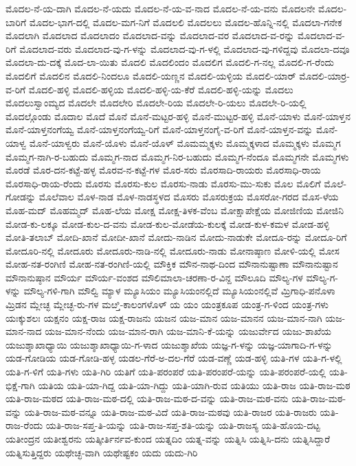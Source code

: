 ಮೊದಲ-ನೆ-ಯ-ದಾಗಿ
ಮೊದಲ-ನೆ-ಯದು
ಮೊದಲ-ನೆ-ಯ-ವ-ನಾದ
ಮೊದಲ-ನೆ-ಯ-ವನು
ಮೊದಲನೇ
ಮೊದಲ-ಬಾರಿಗೆ
ಮೊದಲ-ಭಾಗ-ದಲ್ಲಿ
ಮೊದಲ-ಮಗ-ನಿಗೆ
ಮೊದಲಲಿ
ಮೊದಲಲು
ಮೊದಲ-ಹೊನ್ನಿ-ನಲ್ಲಿ
ಮೊದಲಾ-ಗನೇಕ
ಮೊದಲಾಗಿ
ಮೊದಲಾದ
ಮೊದಲಾದಂ
ಮೊದಲಾದ-ವನ್ನು
ಮೊದಲಾದ-ವರ
ಮೊದಲಾದ-ವ-ರನ್ನು
ಮೊದಲಾದ-ವ-ರಿಗೆ
ಮೊದಲಾದ-ವರು
ಮೊದಲಾದ-ವು-ಗ-ಳನ್ನು
ಮೊದಲಾದ-ವು-ಗ-ಳಲ್ಲಿ
ಮೊದಲಾದ-ವು-ಗಳಿದ್ದವು
ಮೊದಲಾ-ದವೂ
ಮೊದಲಾ-ದು-ದಕ್ಕೆ
ಮೊದ-ಲಾ-ಯಿತು
ಮೊದಲಿ
ಮೊದಲಿಂದಂ
ಮೊದಲಿಗ
ಮೊದಲಿ-ಗ-ನಲ್ಲ
ಮೊದಲಿ-ಗ-ರೆಂದು
ಮೊದಲಿಗೆ
ಮೊದಲಿನ
ಮೊದಲಿ-ನಿಂದಲೂ
ಮೊದಲಿ-ಯಣ್ಣನ
ಮೊದಲಿ-ಯಳ್ಳಿಯ
ಮೊದಲಿ-ಯಾರ್
ಮೊದಲಿ-ಯಾರ್ರ-ವ-ರಿಗೆ
ಮೊದಲಿ-ಹಳ್ಳಿ
ಮೊದಲಿ-ಹಳ್ಳಿಯ
ಮೊದಲಿ-ಹಳ್ಳಿ-ಯ-ಕೆರೆ
ಮೊದಲಿ-ಹಳ್ಳಿ-ಯನ್ನು
ಮೊದಲು
ಮೊದಲುಸ್ವಾಂಮ್ಯದ
ಮೊದಲೇ
ಮೊದಲೇರಿ
ಮೊದಲೇ-ರಿಯ
ಮೊದಲೇ-ರಿ-ಯಲು
ಮೊದಲೇ-ರಿ-ಯಲ್ಲಿ
ಮೊದಲ್ಗೊಂಡು
ಮೊದಾಲ
ಮೊದೆ
ಮೊನೆ
ಮೊನೆ-ಮಟ್ಟರ-ಹಳ್ಳಿ
ಮೊನೆ-ಮುಟ್ಟರ-ಹಳ್ಳಿ
ಮೊನೆ-ಯಾಳು
ಮೊನೆ-ಯಾಳ್ತನ
ಮೊನೆ-ಯಾಳ್ತನಂಗೆಯ್ವ
ಮೊನೆ-ಯಾಳ್ತನಂಗೆಯ್ವ-ರಿಗೆ
ಮೊನೆ-ಯಾಳ್ತನಂಗೈ-ವ-ರಿಗೆ
ಮೊನೆ-ಯಾಳ್ತನ-ವನ್ನು
ಮೊನೆ-ಯಾಳ್ವ
ಮೊನೆ-ಯಾಳ್ವರು
ಮೊನೆ-ಯೊಳು
ಮೊನೆ-ಯೊಳ್
ಮೊಮಮ್ಮಕ್ಕಳು
ಮೊಮ್ಮಕ್ಕಳಾದ
ಮೊಮ್ಮಕ್ಕಳು
ಮೊಮ್ಮಗ
ಮೊಮ್ಮಗ-ನಾಗಿ-ರ-ಬಹುದು
ಮೊಮ್ಮಗ-ನಾದ
ಮೊಮ್ಮಗ-ನಿರ-ಬಹುದು
ಮೊಮ್ಮಗ-ನೆಂದೂ
ಮೊಮ್ಮಗನೇ
ಮೊಮ್ಮಗಳು
ಮೊರಡೆ
ಮೊರ-ದನ-ಕಟ್ಟೆ-ಹಳ್ಳ
ಮೊರವ-ನ-ಕಟ್ಟೆ-ಗಳ
ಮೊರ-ಸರು
ಮೊರಸಾದಿ-ರಾಯರು
ಮೊರಸಾಧಿ-ರಾಯ
ಮೊರಸಾಧಿ-ರಾಯ-ರೆಂದು
ಮೊರಸು
ಮೊರಸು-ಕುಲ
ಮೊರಸು-ನಾಡು
ಮೊರಸು-ಮು-ಸುಕು
ಮೊಲ
ಮೊಲಿಗೆ
ಮೊಲೆ-ಗೋಡನ್ನು
ಮೊಲೆವಾಲ
ಮೊಳ-ನಾಡ
ಮೊಳ-ನಾಡಸ್ಥಳದ
ಮೊಸರು
ಮೊಸರುಕ್ರಯ
ಮೊಸರೋ-ಗರದ
ಮೊಸ-ಳೆಯ
ಮೊಹ-ಮದ್
ಮೊಹಮ್ಮದ್
ಮೊಹ-ಲೆಯ
ಮೋಕ್ಷ
ಮೋಕ್ಷ-ತಿಳಕ-ವೆಂಬ
ಮೋಕ್ಷಾಪೇಕ್ಷೆಯ
ಮೋಜಿಣಿಯ
ಮೋಜಿನಿ
ಮೋಡ-ಕು-ಲಕ್ಕೂ
ಮೋಡ-ಕುಲ-ದ-ವನು
ಮೋಡ-ಕುಲ-ಮೋಡೆಯ-ಕುಲಕ್ಕೆ
ಮೋಡ-ಕುಳ-ಕಮಳ
ಮೋಡ-ಹಳ್ಳಿ
ಮೋತಿ-ತಲಾಬ್
ಮೋದಿ-ಖಾನೆ
ಮೋದೀ-ಖಾನೆ
ಮೋದು-ನಾಡಿನ
ಮೋದು-ನಾಡುಕೇ
ಮೋದೂ-ರನ್ನು
ಮೋದೂ-ರಿಗೆ
ಮೋದೂರಿ-ನಲ್ಲಿ
ಮೋದೂರು
ಮೋದೂರು-ನಾಡಿ-ನಲ್ಲಿ
ಮೋದೂರು-ನಾಡು
ಮೋನಾಷ್ಠಾಣ
ಮೋಳಿ-ಯಲ್ಲಿ
ಮೋಸ
ಮೋಹ-ನತ-ರಂಗಿಣಿ
ಮೋಹ-ನತ-ರಂಗಿಣಿ-ಯಲ್ಲಿ
ಮೌಕ್ತಿಕ
ಮೌನ-ನಾಥ-ದಿಂದ
ಮೌನಾನುಷ್ಟಾಣಾ
ಮೌನಾನುಷ್ಟಾನ
ಮೌನಾನುಷ್ಠಾನ
ಮೌರ್ಯ
ಮೌರ್ಯ-ವಂಶದ
ಮೌಲಿಮಾಲಾ-ಚರಣಾ-ರ-ವಿನ್ದ
ಮೌಲೂದಿ
ಮೌಲ್ಯ-ಗಳ
ಮೌಲ್ಯ-ಗ-ಳನ್ನು
ಮೌಲ್ಯ-ಗಳಿ-ಗಾಗಿ
ಮೌಲ್ವಿ
ಮ್ಯಾಳ
ಮ್ಯೂಸಿಯಂ
ಮ್ಯೂಸಿಯಂನಲ್ಲಿದೆ
ಮ್ಯೂಸಿಯಂನಲ್ಲಿವೆ
ಮ್ರಿಗಾಧಿ-ಪನೊಳಾ
ಮ್ರಿಡನ
ಮ್ಲೇಚ್ಛ
ಮ್ಲೇಚ್ಛ-ರು-ಗಳ
ಮೞ್ತಿ-ಕಾಲಂಗಳೊಳ್
ಯ
ಯಂ
ಯಂತ್ರಕೂಪ
ಯಂತ್ರ-ಗ-ಳಿಂದ
ಯಂತ್ರ-ಗಳು
ಯಃಕ್ಕುಶಲಃ
ಯಕ್ಷನಂ
ಯಕ್ಷ-ರಾಜ
ಯಕ್ಷ-ರಾಜನು
ಯಜನ
ಯಜ-ಮಾನ
ಯಜ-ಮಾನನ
ಯಜ-ಮಾನ-ನಾಗಿ
ಯಜ-ಮಾನ-ನಾದ
ಯಜ-ಮಾನ-ನೆಂದು
ಯಜ-ಮಾನ-ರಾಗಿ
ಯಜ-ಮಾನಿ-ಕೆ-ಯನ್ನು
ಯಜುರ್ವೇದ
ಯಜು-ಶಾಖೆಯ
ಯಜುಶ್ಶಾಖಾಧ್ಯಾಯಿ
ಯಜುಶ್ಶಾಖಾಧ್ಯಾಯಿ-ಗ-ಳಾದ
ಯಜುಶ್ಶಾಖೆಯ
ಯಜ್ಞ-ಗ-ಳನ್ನು
ಯಜ್ಞ-ಯಾಗಾದಿ-ಗ-ಳನ್ನು
ಯಡ-ಗೋಡಿಯ
ಯಡ-ಗೋಡಿ-ಹಳ್ಳ
ಯಡಲ-ಗೆರೆ-ಅ-ದಲ-ಗೆರೆ
ಯಡ-ವಣ್ಣೆ
ಯಡ-ಹಳ್ಳಿ
ಯತಿ-ಗಳ
ಯತಿ-ಗ-ಳಲ್ಲಿ
ಯತಿ-ಗ-ಳಿಗೆ
ಯತಿ-ಗಳು
ಯತಿ-ಗಿರಿ
ಯತಿಗೆ
ಯತಿ-ಪರಂಪರೆ
ಯತಿ-ಪರಂಪರೆ-ಯನ್ನು
ಯತಿ-ಪರಂಪರೆ-ಯಲ್ಲಿ
ಯತಿ-ಭಿಕ್ಷೆ-ಗಾಗಿ
ಯತಿಯ
ಯತಿ-ಯಾ-ಗಿದ್ದ
ಯತಿ-ಯಾ-ಗಿದ್ದು
ಯತಿ-ಯಾಗಿ-ರುವ
ಯತಿಯು
ಯತಿ-ರಾಜ
ಯತಿ-ರಾಜ-ಮಠ
ಯತಿ-ರಾಜ-ಮಠದ
ಯತಿ-ರಾಜ-ಮಠ-ದಲ್ಲಿ
ಯತಿ-ರಾಜ-ಮಠ-ದ-ವನ್ನು
ಯತಿ-ರಾಜ-ಮಠ-ವನು
ಯತಿ-ರಾಜ-ಮಠ-ವನ್ನು
ಯತಿ-ರಾಜ-ಮಠ-ವನ್ನೂ
ಯತಿ-ರಾಜ-ಮಠ-ವಿದೆ
ಯತಿ-ರಾಜ-ಮಠವು
ಯತಿ-ರಾಜರ
ಯತಿ-ರಾಜರು
ಯತಿ-ರಾಜ-ರೆಂದು
ಯತಿ-ರಾಜ-ಸಪ್ತ-ತಿ-ಯನ್ನು
ಯತಿ-ರಾಜ-ಸಪ್ತ-ಶತಿ-ಯನ್ನು
ಯತಿ-ರಾಜಸ್ಯ
ಯತಿ-ಹೊಯ-ದಟ್ಟ
ಯತೀಂದ್ರನ
ಯತೀಶ್ವರನು
ಯತ್ಕೀರ್ತಿರ್ನವ-ಕುಂದ
ಯತ್ನದಿಂ
ಯತ್ನ-ವನ್ನು
ಯತ್ನಿಸಿ
ಯತ್ನಿಸಿ-ದನು
ಯತ್ನಿಸಿದ್ದಾರೆ
ಯತ್ನಿಸುತ್ತಿದ್ದರು
ಯಥೇಚ್ಛ-ವಾಗಿ
ಯಥೇಷ್ಟಕಂ
ಯದು
ಯದು-ಗಿರಿ
